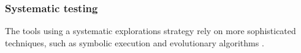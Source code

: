 \subsubsection{Systematic testing}
The tools using a systematic explorations strategy rely on more sophisticated techniques, such as symbolic execution and evolutionary algorithms \cite{areWeThereYet}. 





